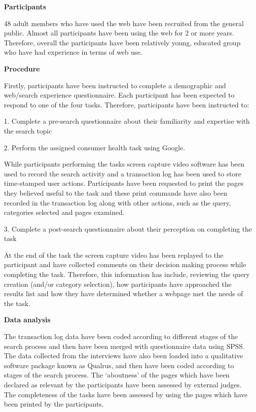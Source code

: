 \documentclass[]{article}
\begin{document}
\textbf{Participants}

48 adult members who have used the web have been recruited from the general public. Almost all participants have been using the web for 2 or more years. Therefore, overall the participants have been relatively young, educated group who have had experience in terms of web use. 

\textbf{Procedure}

Firstly, participants have been instructed to complete a  demographic and web/search experience questionnaire. Each participant has been expected to respond to one of the four tasks. Therefore, participants have been instructed to: 

1. Complete a pre-search questionnaire about their familiarity and expertise with the search topic 

2. Perform the assigned consumer health task using Google. 

While participants performing the tasks screen capture video software has been used to record the search activity and a transaction log has been used to store time-stamped user actions. Participants have been requested to print the pages they believed useful to the task and these print commands have also been recorded in the transaction log along with other actions, such as the query, categories selected and pages examined.

3. Complete a post-search questionnaire about their perception on completing the task 

At the end of the task the screen capture video has been replayed to the participant and have collected comments on their decision making process while completing the task. Therefore, this information has include, reviewing the query creation (and/or category selection), how participants have approached the results list and how they have determined whether a webpage met the needs of the task.   

\textbf{Data analysis}

The transaction log data have been coded according to different stages of the search process and then have been merged with questionnaire data using SPSS. The data collected from the interviews have also been loaded into a qualitative software package known as Qualrus, and then have been coded according to stages of the search process. The ‘aboutness’ of the pages which have been declared as relevant by the participants have been assessed by external judges. The completeness of the tasks have been assessed by using the pages which have been printed by the participants.  
\end{document}
